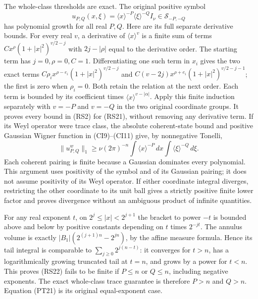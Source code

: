 \documentclass[
  11pt,
]{article}
\begin{document}
The whole-class thresholds are exact. The original positive symbol \[
 u_{P,Q}(x,\xi)=\langle x\rangle^{-P}
                    \langle\xi\rangle^{-Q}I_\nu
                     \in\mathcal S_{-P,-Q}
 \tag{RS21}
\] has polynomial growth for all real \(P,Q\). Here are its full
separate derivative bounds. For every real \(v\), a derivative of
\(\langle x\rangle^v\) is a finite sum of terms
\(C x^\rho(1+|x|^2)^{v/2-j}\) with \(2j-|\rho|\) equal to the derivative
order. The starting term has \(j=0,\rho=0,C=1\). Differentiating one
such term in \(x_i\) gives the two exact terms
\(C\rho_i x^{\rho-e_i}(1+|x|^2)^{v/2-j}\) and
\(C(v-2j)x^{\rho+e_i}(1+|x|^2)^{v/2-j-1}\); the first is zero when
\(\rho_i=0\). Both retain the relation at the next order. Each term is
bounded by its coefficient times \(\langle x\rangle^{v-|\alpha|}\).
Apply this finite induction separately with \(v=-P\) and \(v=-Q\) in the
two original coordinate groups. It proves every bound in (RS2) for
(RS21), without removing any derivative term. If its Weyl operator were
trace class, the absolute coherent-state bound and positive Gaussian
Wigner function in (CI9)--(CI11) give, by nonnegative Tonelli, \[
 \|u_{P,Q}^w\|_1
   \geq\nu(2\pi)^{-n}
          \int\langle x\rangle^{-P}\,dx
          \int\langle\xi\rangle^{-Q}\,d\xi .
 \tag{RS22}
\] Each coherent pairing is finite because a Gaussian dominates every
polynomial. This argument uses positivity of the symbol and of its
Gaussian pairing; it does not assume positivity of its Weyl operator. If
either coordinate integral diverges, restricting the other coordinate to
its unit ball gives a strictly positive finite lower factor and proves
divergence without an ambiguous product of infinite quantities.

For any real exponent \(t\), on \(2^j\leq|x|<2^{j+1}\) the bracket to
power \(-t\) is bounded above and below by positive constants depending
on \(t\) times \(2^{-jt}\). The annulus volume is exactly
\(|B_1|(2^{(j+1)n}-2^{jn})\), by the affine measure formula. Hence its
tail integral is comparable to \(\sum_{j\geq0}2^{j(n-t)}\): it converges
for \(t>n\), has a logarithmically growing truncated tail at \(t=n\),
and grows by a power for \(t<n\). This proves (RS22) fails to be finite
if \(P\leq n\) or \(Q\leq n\), including negative exponents. The exact
whole-class trace guarantee is therefore \(P>n\) and \(Q>n\). Equation
(PT21) is its original equal-exponent case.
\end{document}
